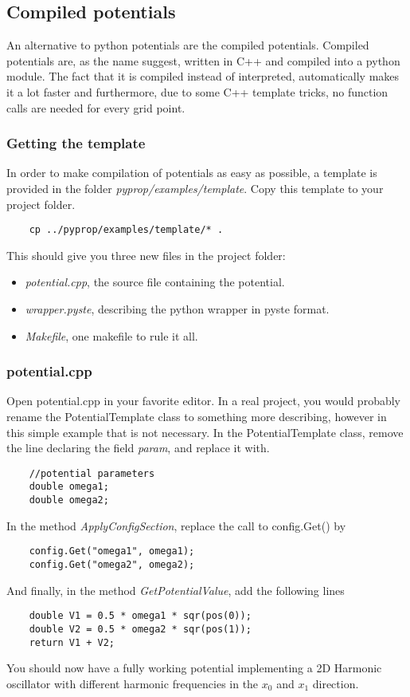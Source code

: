 \subsection{Compiled potentials}
An alternative to python potentials are the compiled potentials. Compiled potentials are, as the name suggest, written 
in C++ and compiled into a python module. The fact that it is compiled instead of interpreted, automatically makes it a
lot faster and furthermore, due to some C++ template tricks, no function calls are needed for every grid point. 

\subsubsection*{Getting the template}
In order to make compilation of potentials as easy as possible, a template is provided in the folder 
\textit{pyprop/examples/template}. Copy this template to your project folder.
\begin{verbatim}
	cp ../pyprop/examples/template/* .
\end{verbatim}
This should give you three new files in the project folder: 
\begin{itemize}
	\item \textit{potential.cpp}, the source file containing the potential.
	\item \textit{wrapper.pyste}, describing the python wrapper in pyste format.
	\item \textit{Makefile}, one makefile to rule it all.
\end{itemize}

\subsubsection*{potential.cpp}
Open potential.cpp in your favorite editor. In a real project, you would probably rename the PotentialTemplate
class to something more describing, however in this simple example that is not necessary. 
In the PotentialTemplate class, remove the line declaring the field \textit{param}, and replace it with.
\begin{verbatim}
	//potential parameters
	double omega1;
	double omega2; 
\end{verbatim}
In the method \textit{ApplyConfigSection}, replace the call to config.Get() by
\begin{verbatim}
	config.Get("omega1", omega1);
	config.Get("omega2", omega2);
\end{verbatim}
And finally, in the method \textit{GetPotentialValue}, add the following lines
\begin{verbatim}
	double V1 = 0.5 * omega1 * sqr(pos(0));
	double V2 = 0.5 * omega2 * sqr(pos(1));
	return V1 + V2;
\end{verbatim}
You should now have a fully working potential implementing a 2D Harmonic oscillator with different harmonic frequencies
in the $x_0$ and $x_1$ direction.

